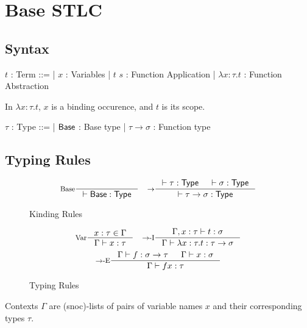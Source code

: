\section{Base STLC}
\subsection{Syntax}
\begin{bnf}
$t$ : \textsf{Term} ::=
| $x$ : Variables
| $t$ $s$ : Function Application
| $\lambda x \colon \tau. t$ : Function Abstraction
\end{bnf}

\hfill\break
In $\lambda x \colon \tau. t$, $x$ is a binding occurence, and $t$ is its scope.

\noindent
\begin{bnf}
$\tau$ : \textsf{Type} ::=
| $\mathsf{Base}$ : Base type
| $\tau \to \sigma$ : Function type
\end{bnf}

\subsection{Typing Rules}
\begin{figure*}[h]
  \[
    \inference[Base]{}
                    {\vdash \Base : \Type}
    \quad
    \inference[$\to$]{\vdash \tau : \Type & \vdash \sigma : \Type}
                     {\vdash \tau \to \sigma : \Type}
  \]

  \caption*{Kinding Rules}
  \label{fig:base-stlc-kinding}
\end{figure*}

\begin{figure*}[h]
  \[
    \inference[Var]{x : \tau \in \Gamma}
                   {\Gamma \vdash x : \tau}
    \quad
    \inference[\Intro{$\to$}]{\Gamma, x : \tau \vdash t : \sigma}
                             {\Gamma \vdash \lambda x : \tau. t : \tau \to \sigma}
  \]
  \[
    \inference[\Elim{$\to$}]{\Gamma \vdash f : \sigma \to \tau & \Gamma \vdash x : \sigma}
                            {\Gamma \vdash f x : \tau}
  \]

  \caption*{Typing Rules}
  \label{fig:base-stlc-typing}
\end{figure*}

Contexts $\Gamma$ are (snoc)-lists of pairs of variable names $x$ and their corresponding types $\tau$.
